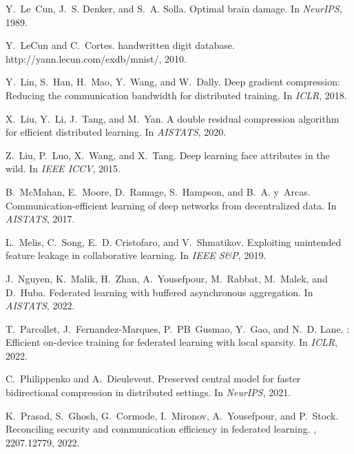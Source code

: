 \documentclass[11pt]{article}
\begin{document}
\begin{thebibliography}{10}
\begin{small}
Y.~Le~Cun, J.~S. Denker, and S.~A. Solla.
\newblock Optimal brain damage.
\newblock In {\em NeurIPS}, 1989.

Y.~LeCun and C.~Cortes.
 handwritten digit database.
\newblock http://yann.lecun.com/exdb/mnist/, 2010.

Y.~Lin, S.~Han, H.~Mao, Y.~Wang, and W.~Dally.
\newblock Deep gradient compression: Reducing the communication bandwidth for
  distributed training.
\newblock In {\em ICLR}, 2018.

X.~Liu, Y.~Li, J.~Tang, and M.~Yan.
\newblock A double residual compression algorithm for efficient distributed
  learning.
\newblock In {\em AISTATS}, 2020.

Z.~Liu, P.~Luo, X.~Wang, and X.~Tang.
\newblock Deep learning face attributes in the wild.
\newblock In {\em {IEEE} ICCV}, 2015.

B.~McMahan, E.~Moore, D.~Ramage, S.~Hampson, and B.~A. y~Arcas.
\newblock Communication-efficient learning of deep networks from decentralized
  data.
\newblock In {\em AISTATS}, 2017.

L.~Melis, C.~Song, E.~D. Cristofaro, and V.~Shmatikov.
\newblock Exploiting unintended feature leakage in collaborative learning.
\newblock In {\em {IEEE} S\&P}, 2019.

J.~Nguyen, K.~Malik, H.~Zhan, A.~Yousefpour, M.~Rabbat, M.~Malek, and D.~Huba.
\newblock Federated learning with buffered asynchronous aggregation.
\newblock In {\em AISTATS}, 2022.

T.~Parcollet, J.~Fernandez-Marques, P.~PB~Gusmao, Y.~Gao, and N.~D. Lane.
: Efficient on-device training for federated learning with
  local sparsity.
\newblock In {\em ICLR}, 2022.

C.~Philippenko and A.~Dieuleveut.
\newblock Preserved central model for faster bidirectional compression in
  distributed settings.
\newblock In {\em NeurIPS}, 2021.

K.~Prasad, S.~Ghosh, G.~Cormode, I.~Mironov, A.~Yousefpour, and P.~Stock.
\newblock Reconciling security and communication efficiency in federated
  learning.
, 2207.12779, 2022.


\end{small}
\end{thebibliography}
\end{document}
